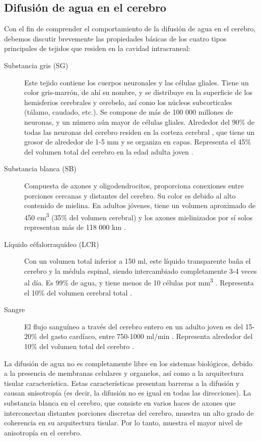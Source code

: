 \subsection{Difusión de agua en el cerebro}

Con el fin de comprender el comportamiento de la
difusión de agua en el cerebro, debemos discutir brevemente las propiedades
básicas de los cuatro tipos principales de tejidos que residen en la
cavidad intracraneal:

\begin{description}
\item[Substancia gris (SG)] Este tejido contiene los cuerpos neuronales y las células gliales. Tiene un color gris-marrón, de ahí su nombre, y se distribuye en la superficie de los hemisferios cerebrales y cerebelo, así como los núcleos subcorticales (tálamo, caudado, etc.). Se compone de más de 100 000 millones de neuronas, y un número aún mayor de células gliales. Alrededor del 90\% de todas las neuronas del cerebro residen en la corteza cerebral \cite{Pakkenberg_1997}, que tiene un grosor de alrededor de 1-5 mm y se organiza en capas. Representa el 45\% del volumen total del cerebro en la edad adulta joven \cite{Rengachary_2004}.
\item[Substancia blanca (SB)] Compuesta de axones y oligodendrocitos, proporciona conexiones entre porciones cercanas y distantes del cerebro. Su color es debido al alto contenido de mielina. En adultos jóvenes, tiene un volumen aproximado de 450 cm\textsuperscript{3} (35\% del volumen cerebral) y los axones mielinizados por sí solos representan más de 118 000 km \cite{Tang_1997}.
\item[Líquido céfalorraquídeo (LCR)] Con un volumen total inferior a 150 ml, este líquido transparente baña el cerebro y la médula espinal, siendo intercambiado completamente 3-4 veces al día. Es 99\% de agua, y tiene menos de 10 células por mm\textsuperscript{3} \cite{Kandel_2000}. Representa el 10\% del volumen cerebral total \cite{Rengachary_2004}.
\item[Sangre] El flujo sanguíneo a través del cerebro entero en un adulto joven es del 15-20\% del gasto cardíaco, entre 750-1000 ml/min \cite{Kandel_2000}. Representa alrededor del 10\% del volumen total del cerebro \cite{Rengachary_2004}.
\end{description}

La difusión de agua no es completamente libre en los sistemas biológicos, debido a la presencia de membranas celulares y organelos, así como a la arquitectura tisular característica. Estas características presentan barreras a la difusión y causan {\emph anisotropía} (es decir, la difusión no es igual en todas las direcciones). La substancia blanca en el cerebro, que consiste en varios haces de axones que interconectan distantes porciones discretas del cerebro, muestra un alto grado de coherencia en su arquitectura tisular. Por lo tanto, muestra el mayor nivel de anisotropía en el cerebro.

